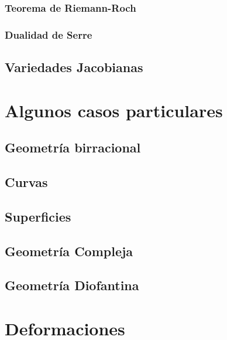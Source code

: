 \documentclass[12pt]{book}
\begin{document}
\subsection{Teorema de Riemann-Roch}

\subsection{Dualidad de Serre}

\section{Variedades Jacobianas}







\chapter{Algunos casos particulares}

\section{Geometría birracional}

\section{Curvas}

\section{Superficies}

\section{Geometría Compleja}

\section{Geometría Diofantina}












\chapter{Deformaciones}
\end{document}
